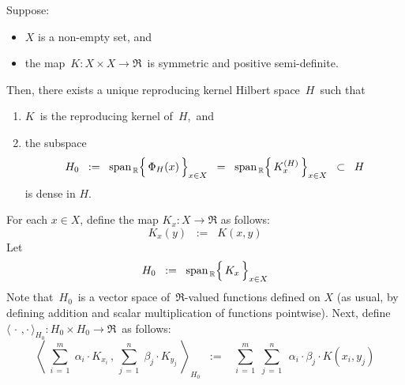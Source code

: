 \vskip 0.5cm
\begin{theorem}
\mbox{}
\vskip 0.1cm
\noindent
Suppose:
\begin{itemize}
\item
	$X$ is a non-empty set, and
\item
	the map \,$K : X \times X \longrightarrow \Re$\, is symmetric and positive semi-definite.
\end{itemize}
Then, there exists a unique reproducing kernel Hilbert space \,$H$\, such that
\begin{enumerate}
\item
	$K$\, is the reproducing kernel of \,$H$,\, and
\item
	the subspace
	\begin{equation*}
	H_{0}
	\;\; := \;\;
		\span_{\,\Re}\!\left\{\,\overset{{\color{white}.}}{\Phi_{H}(x)}\,\right\}_{x \in X}
	\;\; = \;\;
		\span_{\,\Re}\!\left\{\,K^{(H)}_{x}\,\right\}_{x \in X}
	\;\; \subset \;\;
		H
	\end{equation*}
	is dense in $H$.
\end{enumerate}
\end{theorem}
\proof
For each $x \in X$, define the map $K_{x} : X \longrightarrow \Re$ as follows:
\begin{equation*}
K_{x}(y) \;\; := \;\; K(x,y)
\end{equation*}
Let
\begin{equation*}
H_{0}
\;\; := \;\;
	\span_{\,\Re}\!\left\{\,\overset{{\color{white}.}}{K_{x}}\,\right\}_{x \in X}
\end{equation*}
Note that \,$H_{0}$\, is a vector space of \,$\Re$-valued functions
defined on $X$
(as usual, by defining addition and scalar multiplication of functions pointwise).
Next, define
\,$\langle\,\cdot\,,\cdot\,\rangle_{H_{0}} : H_{0} \times H_{0} \longrightarrow \Re$\,
as follows:
\begin{equation*}
\left\langle\;
	\overset{m}{\underset{i\,=\,1}{\sum}}\; \alpha_{i} \cdot K_{x_{i}}
	\,,\,
	\overset{n}{\underset{j\,=\,1}{\sum}}\; \beta_{j} \cdot K_{y_{j}}
	\;\right\rangle_{\!\!H_{0}}
\;\; := \;\;\;
	\overset{m}{\underset{i\,=\,1}{\sum}}\;
	\overset{n}{\underset{j\,=\,1}{\sum}}\;\,
	\alpha_{i} \cdot \beta_{j} \cdot K(x_{i},y_{j})
\end{equation*}

